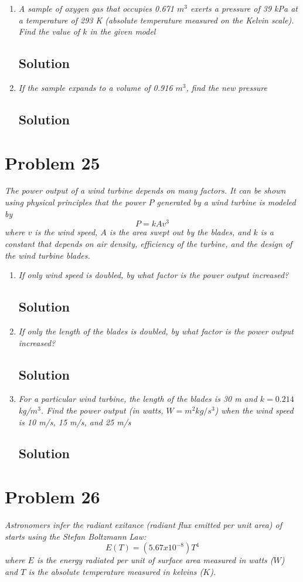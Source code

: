 \documentclass[11pt]{article}
\newcommand{\soln}{\subsection*}
\newcommand{\qn}{\textit}
\begin{document}
\begin{enumerate}
	\item \qn{A sample of oxygen gas that occupies 0.671 $m^3$ exerts a pressure of 39 kPa at a temperature of 293 K (absolute temperature measured on the Kelvin scale). Find the value of $k$ in the given model}
	\soln{Solution}
	
	\item \qn{If the sample expands to a volume of 0.916 $m^3$, find the new pressure}
	\soln{Solution}
\end{enumerate}

\section*{Problem 25}

\qn{The power output of a wind turbine depends on many factors. It can be shown using physical principles that the power $P$ generated by a wind turbine is modeled by $$P=kAv^3$$ where $v$ is the wind speed, $A$ is the area swept out by the blades, and $k$ is a constant that depends on air density, efficiency of the turbine, and the design of the wind turbine blades.}

\begin{enumerate}
	\item \qn{If only wind speed is doubled, by what factor is the power output increased?}
	\soln{Solution}
	
	\item \qn{If only the length of the blades is doubled, by what factor is the power output increased?}
	\soln{Solution}
	
	\item \qn{For a particular wind turbine, the length of the blades is 30 m and $k=0.214$ kg/$m^3$. Find the power output (in watts, $W=m^2kg/s^3$) when the wind speed is 10 m/s, 15 m/s, and 25 m/s}
	\soln{Solution}
\end{enumerate}

\section*{Problem 26}

\qn{Astronomers infer the radiant exitance (radiant flux emitted per unit area) of starts using the Stefan Boltzmann Law: $$E(T)=(5.67 x 10^{-8})T^4$$ where $E$ is the energy radiated per unit of surface area measured in watts ($W$) and $T$ is the absolute temperature measured in kelvins ($K$).}
\end{document}

